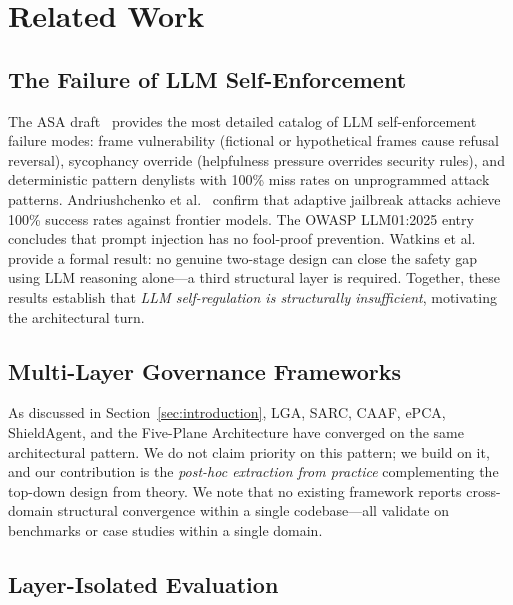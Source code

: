 \documentclass[letterpaper]{article}
\begin{document}
\section{Related Work}

\subsection{The Failure of LLM Self-Enforcement}

The ASA draft~\cite{baysal2026} provides the most detailed catalog of
LLM self-enforcement failure modes: frame vulnerability (fictional or
hypothetical frames cause refusal reversal), sycophancy override (helpfulness
pressure overrides security rules), and deterministic pattern denylists with
100\% miss rates on unprogrammed attack patterns.  Andriushchenko et al.\
\cite{andriushchenko2025} confirm that adaptive jailbreak attacks achieve 100\%
success rates against frontier models.  The OWASP LLM01:2025 entry
\cite{owasp2025} concludes that prompt injection has no fool-proof prevention.
Watkins et al.\ \cite{watkins2026} provide a formal result: no genuine
two-stage design can close the safety gap using LLM reasoning alone---a
third structural layer is required.  Together, these results establish that
\textit{LLM self-regulation is structurally insufficient}, motivating the
architectural turn.

\subsection{Multi-Layer Governance Frameworks}

As discussed in Section~\ref{sec:introduction}, LGA, SARC, CAAF, ePCA,
ShieldAgent, and the Five-Plane Architecture have converged on the same
architectural pattern.  We do not claim priority on this pattern; we build
on it, and our contribution is the \textit{post-hoc extraction from practice}
complementing the top-down design from theory.  We note that no existing
framework reports cross-domain structural convergence within a single
codebase---all validate on benchmarks or case studies within a single domain.

\subsection{Layer-Isolated Evaluation}
\end{document}
